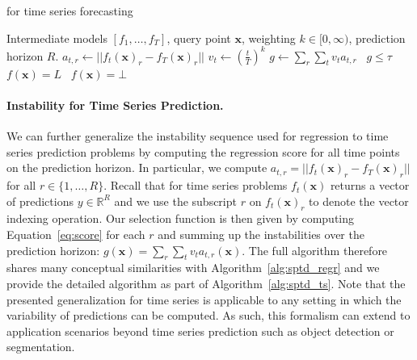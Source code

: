 \begin{algorithm}[t]
    \caption{\sptd for time series forecasting}\label{alg:sptd_ts}
    \begin{algorithmic}[1]
    \Require Intermediate models $[f_1,\ldots,f_T]$, query point $\bm{x}$, weighting $k \in [0,\infty)$, prediction horizon $R$. 
            \State $a_{t,r} \gets ||f_{t}(\bm{x})_r - f_{T}(\bm{x})_r||$
        \EndFor
        \State $v_t \gets (\frac{t}{T})^k$
    \EndFor
\State $g \gets \sum_r\sum_{t} v_t a_{t,r}$
\State \algorithmicif\ $g \leq \tau$ \algorithmicthen\ $f(\bm{x}) = L$ \algorithmicelse\ $f(\bm{x}) = \bot$
    \end{algorithmic}
\end{algorithm}

\paragraph{Instability for Time Series Prediction.} We can further generalize the instability sequence used for regression to time series prediction problems by computing the regression score for all time points on the prediction horizon. In particular, we compute $a_{t,r} = ||f_{t}(\bm{x})_r - f_{T}(\bm{x})_r||$ for all $r \in \{1,\ldots,R\}$. Recall that for time series problems $f_{t}(\bm{x})$ returns a vector of predictions $y \in \mathbb{R}^R$ and we use the subscript $r$ on $f_{t}(\bm{x})_r$ to denote the vector indexing operation. Our selection function is then given by computing Equation~\ref{eq:score} for each $r$ and summing up the instabilities over the prediction horizon: $g(\bm{x}) = \sum_r\sum_{t} v_t a_{t,r}(\bm{x})$. The full algorithm therefore shares many conceptual similarities with Algorithm~\ref{alg:sptd_regr} and we provide the detailed algorithm as part of Algorithm~\ref{alg:sptd_ts}. Note that the presented generalization for time series is applicable to any setting in which the variability of predictions can be computed. As such, this formalism can extend to application scenarios beyond time series prediction such as object detection or segmentation.


